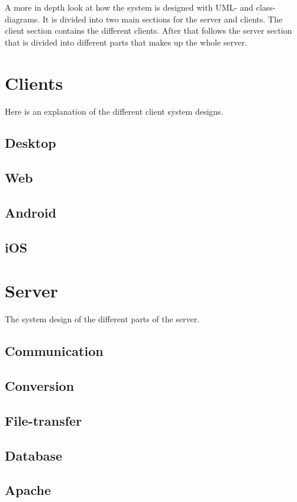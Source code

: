 
A more in depth look at how the system is designed with UML- and class-diagrams. It is divided into two main sections for the server and clients. The client section contains the different clients. After that follows the server section that is divided into different parts that makes up the whole server. 

\section{Clients}
Here is an explanation of the  different client system designs.
\subsection{Desktop}

\FloatBarrier
\subsection{Web}


\FloatBarrier
\subsection{Android}

\FloatBarrier
\subsection{iOS}

\FloatBarrier
\section{Server}
The system design of the different parts of the server.
\subsection{Communication}

\FloatBarrier
\subsection{Conversion}

\FloatBarrier
\subsection{File-transfer}

\FloatBarrier
\subsection{Database}

\FloatBarrier
\subsection{Apache}

\FloatBarrier
